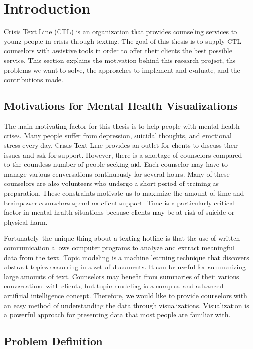 \chapter{Introduction}

Crisis Text Line (CTL) is an organization that provides counseling services to young
people in crisis through texting. The goal of this thesis is to supply CTL counselors
with assistive tools in order to offer their clients the best possible service. This section
explains the motivation behind this research project, the problems we want to solve,
the approaches to implement and evaluate, and the contributions made.

\section{Motivations for Mental Health Visualizations}

The main motivating factor for this thesis is to help people with mental health crises.
Many people suffer from depression, suicidal thoughts, and emotional stress every
day. Crisis Text Line provides an outlet for clients to discuss their issues and ask
for support. However, there is a shortage of counselors compared to the countless
number of people seeking aid. Each counselor may have to manage various
conversations continuously for several hours. Many of these counselors are also
volunteers who undergo a short period of training as preparation. These constraints
motivate us to maximize the amount of time and brainpower counselors spend on
client support. Time is a particularly critical factor in mental health situations because
clients may be at risk of suicide or physical harm.

Fortunately, the unique thing about a texting hotline is that the use of written
communication allows computer programs to analyze and extract meaningful data
from the text. Topic modeling is a machine learning technique that discovers abstract
topics occurring in a set of documents. It can be useful for summarizing large amounts
of text. Counselors may benefit from summaries of their various conversations with
clients, but topic modeling is a complex and advanced artificial intelligence concept.
Therefore, we would like to provide counselors with an easy method of understanding
the data through visualizations. Visualization is a powerful approach for presenting
data that most people are familiar with.

\section{Problem Definition}

